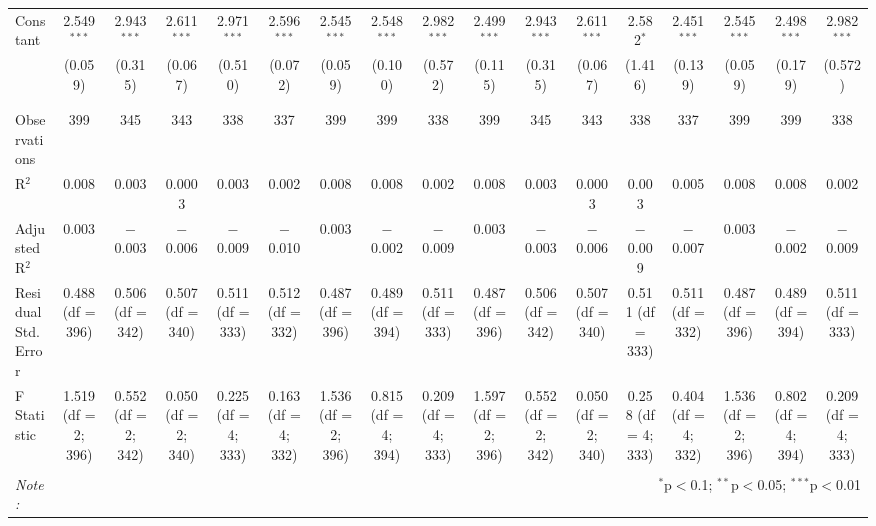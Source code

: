 \begin{table}[!htbp]
\begin{tabular}{@{\extracolsep{5pt}}lcccccccccccccccc}
 Constant & 2.549$^{***}$ & 2.943$^{***}$ & 2.611$^{***}$ & 2.971$^{***}$ & 2.596$^{***}$ & 2.545$^{***}$ & 2.548$^{***}$ & 2.982$^{***}$ & 2.499$^{***}$ & 2.943$^{***}$ & 2.611$^{***}$ & 2.582$^{*}$ & 2.451$^{***}$ & 2.545$^{***}$ & 2.498$^{***}$ & 2.982$^{***}$ \\ 
  & (0.059) & (0.315) & (0.067) & (0.510) & (0.072) & (0.059) & (0.100) & (0.572) & (0.115) & (0.315) & (0.067) & (1.416) & (0.139) & (0.059) & (0.179) & (0.572) \\ 
  & & & & & & & & & & & & & & & & \\ 
\hline \\[-1.8ex] 
Observations & 399 & 345 & 343 & 338 & 337 & 399 & 399 & 338 & 399 & 345 & 343 & 338 & 337 & 399 & 399 & 338 \\ 
R$^{2}$ & 0.008 & 0.003 & 0.0003 & 0.003 & 0.002 & 0.008 & 0.008 & 0.002 & 0.008 & 0.003 & 0.0003 & 0.003 & 0.005 & 0.008 & 0.008 & 0.002 \\ 
Adjusted R$^{2}$ & 0.003 & $-$0.003 & $-$0.006 & $-$0.009 & $-$0.010 & 0.003 & $-$0.002 & $-$0.009 & 0.003 & $-$0.003 & $-$0.006 & $-$0.009 & $-$0.007 & 0.003 & $-$0.002 & $-$0.009 \\ 
Residual Std. Error & 0.488 (df = 396) & 0.506 (df = 342) & 0.507 (df = 340) & 0.511 (df = 333) & 0.512 (df = 332) & 0.487 (df = 396) & 0.489 (df = 394) & 0.511 (df = 333) & 0.487 (df = 396) & 0.506 (df = 342) & 0.507 (df = 340) & 0.511 (df = 333) & 0.511 (df = 332) & 0.487 (df = 396) & 0.489 (df = 394) & 0.511 (df = 333) \\ 
F Statistic & 1.519 (df = 2; 396) & 0.552 (df = 2; 342) & 0.050 (df = 2; 340) & 0.225 (df = 4; 333) & 0.163 (df = 4; 332) & 1.536 (df = 2; 396) & 0.815 (df = 4; 394) & 0.209 (df = 4; 333) & 1.597 (df = 2; 396) & 0.552 (df = 2; 342) & 0.050 (df = 2; 340) & 0.258 (df = 4; 333) & 0.404 (df = 4; 332) & 1.536 (df = 2; 396) & 0.802 (df = 4; 394) & 0.209 (df = 4; 333) \\ 
\hline 
\hline \\[-1.8ex] 
\textit{Note:}  & \multicolumn{16}{r}{$^{*}$p$<$0.1; $^{**}$p$<$0.05; $^{***}$p$<$0.01} \\ 
\end{tabular} 
\end{table} 
